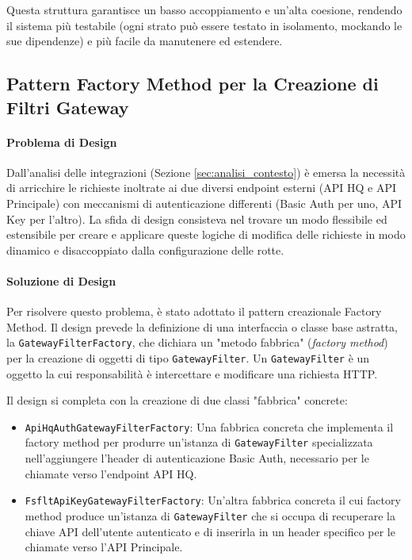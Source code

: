 \documentclass[12pt,a4paper,openright,twoside]{book}
\begin{document}
\FloatBarrier

Questa struttura garantisce un basso accoppiamento e un'alta coesione, rendendo il sistema più testabile (ogni strato può essere testato in isolamento, mockando le sue dipendenze) e più facile da manutenere ed estendere.





\subsection{Pattern Factory Method per la Creazione di Filtri Gateway}
\label{subsec:design_factory}

\paragraph{Problema di Design}
Dall'analisi delle integrazioni (Sezione \ref{sec:analisi_contesto}) è emersa la necessità di arricchire le richieste inoltrate ai due diversi endpoint esterni (API HQ e API Principale) con meccanismi di autenticazione differenti (Basic Auth per uno, API Key per l'altro). La sfida di design consisteva nel trovare un modo flessibile ed estensibile per creare e applicare queste logiche di modifica delle richieste in modo dinamico e disaccoppiato dalla configurazione delle rotte.


\paragraph{Soluzione di Design}
Per risolvere questo problema, è stato adottato il pattern creazionale Factory Method. Il design prevede la definizione di una interfaccia o classe base astratta, la \texttt{GatewayFilterFactory}, che dichiara un "metodo fabbrica" (\textit{factory method}) per la creazione di oggetti di tipo \texttt{GatewayFilter}. Un \texttt{GatewayFilter} è un oggetto la cui responsabilità è intercettare e modificare una richiesta HTTP.

Il design si completa con la creazione di due classi "fabbrica" concrete:
\begin{itemize}
    \item \texttt{ApiHqAuthGatewayFilterFactory}: Una fabbrica concreta che implementa il factory method per produrre un'istanza di \texttt{GatewayFilter} specializzata nell'aggiungere l'header di autenticazione Basic Auth, necessario per le chiamate verso l'endpoint API HQ.
    \item \texttt{FsfltApiKeyGatewayFilterFactory}: Un'altra fabbrica concreta il cui factory method produce un'istanza di \texttt{GatewayFilter} che si occupa di recuperare la chiave API dell'utente autenticato e di inserirla in un header specifico per le chiamate verso l'API Principale.
\end{itemize}
\end{document}
